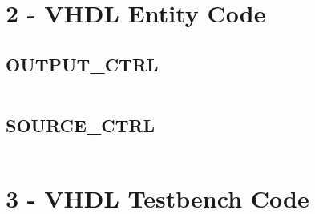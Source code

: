 \documentclass[11pt]{report}
\begin{document}
\section*{2 - VHDL Entity Code}
\subsection*{OUTPUT\_CTRL}
\inputminted{vhdl}{../../../DE_Project_T2/DE_Project_T2.srcs/sources_1/imports/DigEng_Proj_T2_model/SOURCE_CTRL.vhd}

\subsection*{SOURCE\_CTRL}
\inputminted{vhdl}{../../../DE_Project_T2/DE_Project_T2.srcs/sources_1/imports/DigEng_Proj_T2_model/OUTPUT_CTRL.vhd}





\section*{3 - VHDL Testbench Code}
\inputminted{vhdl}{../../../DE_Project_T2/DE_Project_T2.srcs/sim_1/imports/DigEng_Proj_T2_model/TOP_LEVEL_tb.vhd}
\end{document}

